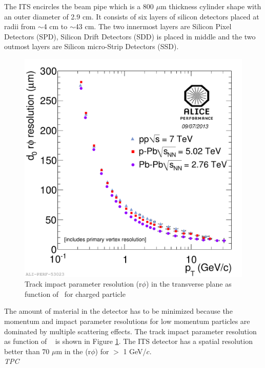The ITS encircles the beam pipe which is a 800 $\mu$m thickness cylinder shape with an outer diameter of 2.9 cm. It consists of six layers of silicon detectors placed at radii from $\sim$4 cm to $\sim$43 cm. The two innermost layers are Silicon Pixel Detectors (SPD), Silicon Drift Detectors (SDD) is placed in middle and the two outmost layers are Silicon micro-Strip Detectors (SSD). 

\begin{figure}[htbp]
\begin{center}
\includegraphics[width=10.cm]{./Version1/FigChapter4/ITSPerformance}
\caption{Track impact parameter resolution (r$\phi$) in the transverse plane as function of  \pt~for charged particle}
\label{fig:itsperformance}
\end{center}
\end{figure}


The amount of material in the detector has to be minimized because the momentum and impact parameter resolutions for low momentum particles are dominated by multiple scattering effects. The track impact parameter resolution as function of \pt~ is shown in Figure \ref{fig:itsperformance}. The ITS detector has a spatial resolution better than 70 $\mu$m in the (r$\phi$) for \pt $>$ 1 GeV/$c$. \\





{\Large\textsl{TPC}}\\


